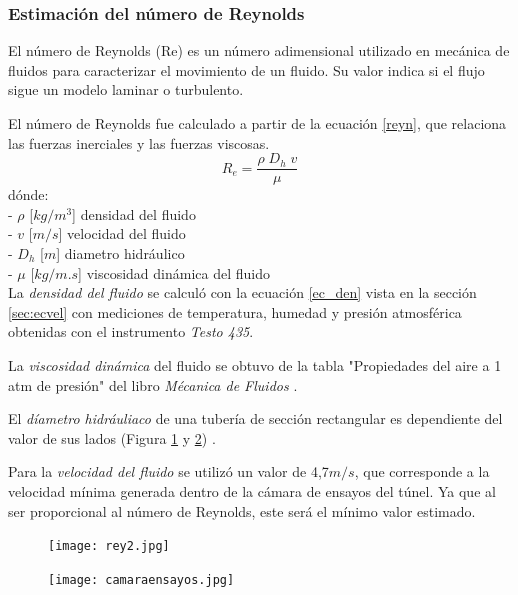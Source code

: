 \subsubsection{Estimación del número de Reynolds}
\begin{tcolorbox}[colback=blue!5!white,colframe=blue!75!black,title=Número de Reynolds]
	El número de Reynolds (Re) es un número adimensional utilizado en mecánica de fluidos para caracterizar el movimiento de un fluido. Su valor indica si el flujo sigue un modelo laminar o turbulento.
\end{tcolorbox}
El número de Reynolds fue calculado a partir de la ecuación \ref{reyn}, que relaciona las fuerzas inerciales y las fuerzas viscosas. 
\begin{equation}	
	R_e=\frac{\rho\;D_h\;v}\mu
	\label{reyn}
\end{equation}	
dónde:\\
- \textbf{$\rho$ } [$kg/m^{3}$] densidad del fluido \\
- \textbf{$v$ } [$m/s$] velocidad del fluido\\
- \textbf{$D_h$ } [$m$] diametro hidráulico\\
- \textbf{$\mu$ } [$kg/m.s$] viscosidad dinámica del fluido\\

La \textit{densidad del fluido} se calculó con la ecuación \ref{ec_den} vista en la sección \ref{sec:ecvel} con mediciones de temperatura, humedad y presión atmosférica obtenidas con el instrumento \textit{Testo 435}.

La \textit{viscosidad dinámica} del fluido se obtuvo de la tabla "Propiedades del aire a 1 atm de presión" { }del libro \textit{Mécanica de Fluidos} \cite{yunus2006mecanica}.

El \textit{díametro hidráuliaco} de una tubería de sección rectangular es dependiente del valor de sus lados (Figura \ref{fig:rey2} y \ref{fig:camens}) \cite{licci2020estudio}.

Para la \textit{velocidad del fluido} se utilizó un valor de 4,7$m/s$, que corresponde a la velocidad mínima generada dentro de la cámara de ensayos del túnel. Ya que al ser proporcional al número de Reynolds, este será el mínimo valor estimado.

\begin{figure}[htb]
	\centering
	\texttt{[image: rey2.jpg]}
	\label{fig:rey2}
\end{figure}


\begin{figure}[htb]
	\centering
	\texttt{[image: camaraensayos.jpg]}
	\label{fig:camens}
\end{figure}

